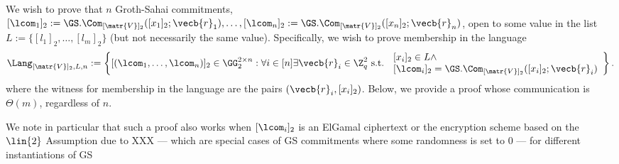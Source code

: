We wish to prove that $n$ Groth-Sahai commitments, $[\lcom_1]_2:=\GS.\Com_{[\matr{V}]_2}([x_1]_2;\vecb{r}_1),\ldots,[\lcom_n]_2:=\GS.\Com_{[\matr{V}]_2}([x_n]_2;\vecb{r}_n)$, open to some value in the list $L:=\{[l_1]_2,\ldots,[l_m]_2\}$ (but not necessarily the same value). Specifically, we wish to prove membership in the language
$$
\Lang_{[\matr{V}]_2,L,n}:=\left\{[(\lcom_1,\ldots,\lcom_n)]_2\in\GG_2^{2\times n}:\forall i\in[n]\exists\vecb{r}_i\in\Z_q^2\text{ s.t. }\begin{array}{l}{[x_i]_2}\in L\wedge\\ {[\lcom_i]_2=\GS.\Com_{[\matr{V}]_2}([x_i]_2;\vecb{r}_i)}\end{array}\right\}.
$$
where the witness for membership in the language are the pairs  $(\vecb{r}_i,[x_i]_2)$. Below, we provide a proof whose communication is $\Theta(m)$, regardless of $n$. 

We note in particular that such a proof also works when $[\lcom_i]_2$ is an ElGamal ciphertext or the encryption scheme based on the $\lin{2}$ Assumption due to XXX --- which are special  cases of GS commitments where some randomness is set to $0$ --- for different instantiations of GS 

